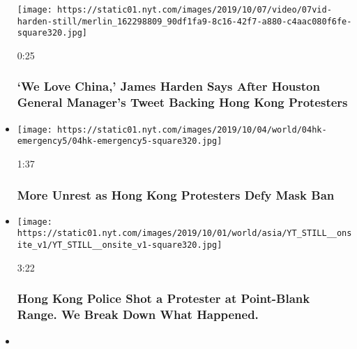 \begin{itemize}
  \texttt{[image: https://static01.nyt.com/images/2019/10/07/video/07vid-harden-still/merlin\_162298809\_90df1fa9-8c16-42f7-a880-c4aac080f6fe-square320.jpg]}

  0:25

  \hypertarget{we-love-china-james-harden-says-after-houston-general-managers-tweet-backing-hong-kong-protesters}{%
  \subsubsection{`We Love China,' James Harden Says After Houston
  General Manager's Tweet Backing Hong Kong
  Protesters}\label{we-love-china-james-harden-says-after-houston-general-managers-tweet-backing-hong-kong-protesters}}
\item
  \href{https://www.nytimes.com/video/world/asia/100000006751868/hong-kong-mask-ban.html?action=click\&module=video-series-bar\&region=header\&pgtype=Article\&playlistId=video/hk-protest}{}

  \texttt{[image: https://static01.nyt.com/images/2019/10/04/world/04hk-emergency5/04hk-emergency5-square320.jpg]}

  1:37

  \hypertarget{more-unrest-as-hong-kong-protesters-defy-mask-ban}{%
  \subsubsection{More Unrest as Hong Kong Protesters Defy Mask
  Ban}\label{more-unrest-as-hong-kong-protesters-defy-mask-ban}}
\item
  \href{https://www.nytimes.com/video/world/asia/100000006745719/hong-kong-protester-shot.html?action=click\&module=video-series-bar\&region=header\&pgtype=Article\&playlistId=video/hk-protest}{}

  \texttt{[image: https://static01.nyt.com/images/2019/10/01/world/asia/YT\_STILL\_\_onsite\_v1/YT\_STILL\_\_onsite\_v1-square320.jpg]}

  3:22

  \hypertarget{hong-kong-police-shot-a-protester-at-point-blank-range-we-break-down-what-happened}{%
  \subsubsection{Hong Kong Police Shot a Protester at Point-Blank Range.
  We Break Down What
  Happened.}\label{hong-kong-police-shot-a-protester-at-point-blank-range-we-break-down-what-happened}}
\item
  \href{https://www.nytimes.com/video/world/asia/100000006745689/china-national-day-hong-kong-protests.html?action=click\&module=video-series-bar\&region=header\&pgtype=Article\&playlistId=video/hk-protest}{}


\end{itemize}

